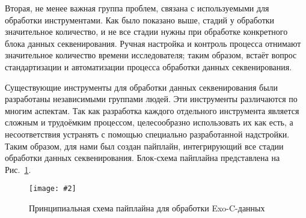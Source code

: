 \documentclass[a4paper,14pt]{extarticle}
\newcommand{\bigfiga}[5]{
\begin{figure}[#1]
\centering
\texttt{[image: \#2]}
\caption{\label{#3}#4}
\end{figure}
}
\newcommand{\ris}[1]{Рис.~\ref{#1}}
\begin{document}
Вторая, не менее важная группа проблем, связана с используемыми для обработки инструментами.
Как было показано выше, стадий у обработки значительное количество, и не все стадии нужны при обработке конкретного блока данных секвенирования.
Ручная настройка и контроль процесса отнимают значительное количество времени исследователя;
таким образом, встаёт вопрос стандартизации и автоматизации процесса обработки данных секвенирования.

Существующие инструменты для обработки данных секвенирования были разработаны независимыми группами людей.
Эти инструменты различаются по многим аспектам.
% 
%
Так как разработка каждого отдельного инструмента является сложным и трудоёмким процессом, целесообразно использовать их как есть, а несоответствия устранять с помощью специально разработанной надстройки.
Таким образом, для нами был создан пайплайн, интегрирующий все стадии обработки данных секвенирования.
Блок-схема пайплайна представлена на \ris{fig:pipeline}.

\bigfiga{h}{BlockScheme.pdf}{fig:pipeline}{Принципиальная схема пайплайна для обработки Exo-C-данных}{1}
\end{document}
